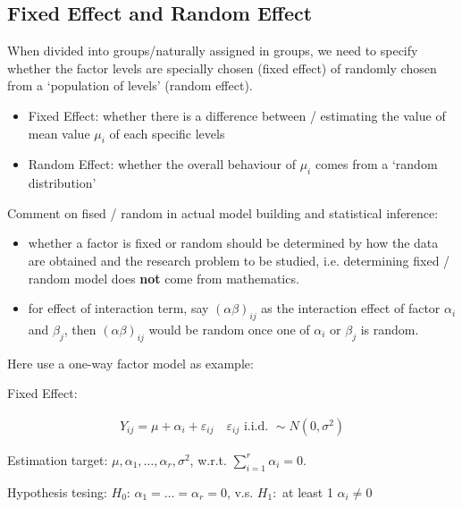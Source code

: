     


\subsection{Fixed Effect and Random Effect}
    When divided into groups/naturally assigned in groups, we need to specify whether the factor levels are specially chosen (fixed effect) of randomly chosen from a `population of levels' (random effect). 
    \begin{itemize}[topsep=2pt,itemsep=0pt]
        \item Fixed Effect: whether there is a difference between / estimating the value of mean value $ \mu _i $ of each specific levels
        \item Random Effect: whether the overall behaviour of $ \mu _i $ comes from a `random distribution'
    \end{itemize}

    Comment on fised / random in actual model building and statistical inference:
    \begin{itemize}[topsep=2pt,itemsep=0pt]
        \item whether a factor is fixed or random should be determined by how the data are obtained and the research problem to be studied, i.e. determining fixed / random model does \textbf{not} come from mathematics.
        \item for effect of interaction term, say $ (\alpha\beta )_{ij} $ as the interaction effect of factor $ \alpha _i $ and $ \beta _j $, then $ (\alpha \beta )_{ij} $ would be random once one of $ \alpha _i $ or $ \beta  _j$ is random.
    \end{itemize}
    

    Here use a one-way factor model as example:
    

    \begin{point}
        Fixed Effect:
    \end{point}
    
        
    \begin{align}
        Y_{ij}=\mu+\alpha _i+\varepsilon _{ij}\quad \varepsilon _{ij}\text{ i.i.d. }\sim N(0,\sigma ^2) 
    \end{align}    

    Estimation target: $ \mu ,\alpha _1,\ldots,\alpha _r,\sigma ^2 $, w.r.t. $\sum_{i=1}^r\alpha _i=0$.

    Hypothesis tesing: $ H_0:\,\alpha _1=\ldots=\alpha _r=0 $, v.s. $ H_1: $ at least 1 $ \alpha _i\neq 0 $

